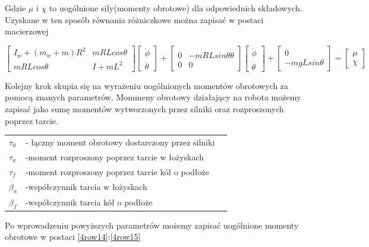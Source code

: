 Gdzie $\mu$ i $\chi$ to uogólnione siły(momenty obrotowe) dla odpowiednich składowych.
Uzyskane w ten sposób równania różniczkowe można zapisać w postaci macierzowej 


\begin{equation}
\label{4row13} 
\begin{bmatrix} {I_w+(m_w+m)R^2} & {mRLcos \theta} \\{mRLcos\theta} & {I+mL^2} \end{bmatrix}
\begin{bmatrix}	\ddot{\phi}  \\	\ddot{\theta}  \end{bmatrix} +
\begin{bmatrix}	0 &-mRLsin\theta\dot{\theta} \\	0 &0 \end{bmatrix} 
\begin{bmatrix}	\dot{\phi}  \\	\dot{\theta} \end{bmatrix} +
\begin{bmatrix}	{0}  \\	{-mgLsin\theta}  \end{bmatrix} =
\begin{bmatrix}	{\mu}  \\	{\chi} \end{bmatrix}  
\end{equation}

Kolejny krok skupia się na wyrażeniu uogólnionych momentów obrotowych za pomocą znanych parametrów. Mommeny obrotowy działający na robota możemy zapisać jako sumę momentów wytworzonych przez silniki oraz rozproszonych poprzez tarcie. 


	\begin{tabular}{  l l  p{3cm} |}
	$ \tau_0 $& - łączny moment obrotowy dostarczony przez silniki \\ 
	$ \tau_a $  & -moment rozproszony poprzez tarcie w łożyskach \\ 
	$ \tau_f $  & -moment rozproszony poprzez tarcie kół o podłoże \\ 	
	$ \beta_a $  & -współczynnik tarcia w łożyskach \\ 	
	$ \beta_f $  & -współczynnik tarcia kół o podłoże \\ 	
\end{tabular}  

Po wprowadzeniu powyższych parametrów możemy zapisać uogólnione momenty obrotowe w postaci \ref{4row14}:\ref{4row15}

